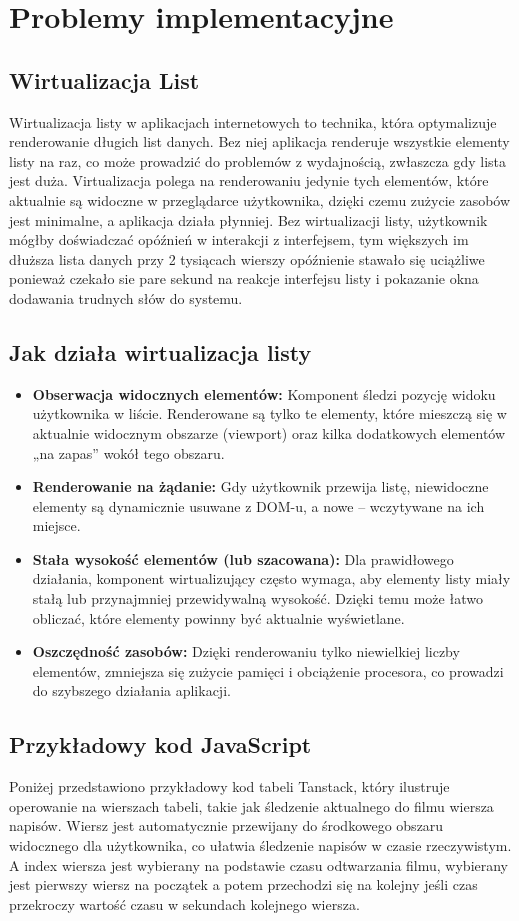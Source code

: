 \section{Problemy implementacyjne}
\subsection{Wirtualizacja List}
Wirtualizacja listy w aplikacjach internetowych to technika, która optymalizuje renderowanie długich list danych. Bez niej aplikacja renderuje wszystkie elementy listy na raz, co może prowadzić do problemów z wydajnością, zwłaszcza gdy lista jest duża. Virtualizacja polega na renderowaniu jedynie tych elementów, które aktualnie są widoczne w przeglądarce użytkownika, dzięki czemu zużycie zasobów jest minimalne, a aplikacja działa płynniej. Bez wirtualizacji listy, użytkownik mógłby doświadczać opóźnień w interakcji z interfejsem, tym większych im dłuższa lista danych przy 2 tysiącach wierszy opóźnienie stawało się uciążliwe ponieważ czekało sie pare sekund na reakcje interfejsu listy i pokazanie okna dodawania trudnych słów do systemu.


\subsection*{Jak działa wirtualizacja listy}
\begin{itemize}
    \item \textbf{Obserwacja widocznych elementów:} Komponent śledzi pozycję widoku użytkownika w liście. Renderowane są tylko te elementy, które mieszczą się w aktualnie widocznym obszarze (viewport) oraz kilka dodatkowych elementów „na zapas” wokół tego obszaru.
    \item \textbf{Renderowanie na żądanie:} Gdy użytkownik przewija listę, niewidoczne elementy są dynamicznie usuwane z DOM-u, a nowe – wczytywane na ich miejsce.
    \item \textbf{Stała wysokość elementów (lub szacowana):} Dla prawidłowego działania, komponent wirtualizujący często wymaga, aby elementy listy miały stałą lub przynajmniej przewidywalną wysokość. Dzięki temu może łatwo obliczać, które elementy powinny być aktualnie wyświetlane.
    \item \textbf{Oszczędność zasobów:} Dzięki renderowaniu tylko niewielkiej liczby elementów, zmniejsza się zużycie pamięci i obciążenie procesora, co prowadzi do szybszego działania aplikacji.
\end{itemize}
\subsection*{Przykładowy kod JavaScript}
Poniżej przedstawiono przykładowy kod tabeli Tanstack, który ilustruje operowanie na wierszach tabeli, takie jak śledzenie aktualnego do filmu wiersza napisów. Wiersz jest automatycznie przewijany do środkowego obszaru widocznego dla użytkownika, co ułatwia śledzenie napisów w czasie rzeczywistym. A index wiersza jest wybierany na podstawie czasu odtwarzania filmu, wybierany jest pierwszy wiersz na początek a potem przechodzi się na kolejny jeśli czas przekroczy wartość czasu w sekundach kolejnego wiersza.

